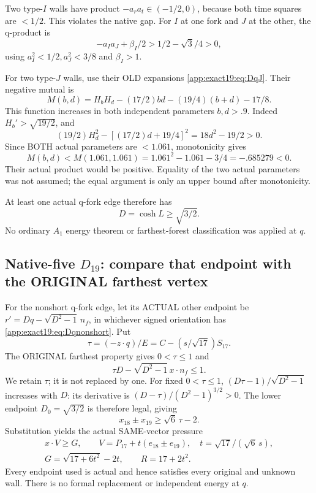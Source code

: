 \documentclass[11pt]{article}
\theoremstyle{definition}
\theoremstyle{remark}
\begin{document}
Two type-\(I\) walls have product
\(-a_ra_t\in(-1/2,0)\), because
both time squares are \(<1/2\).
This violates the native gap.
For \(I\) at one fork and \(J\)
at the other, the q-product is
\[
             -a_Ia_J+\beta_I/2
                     >1/2-\sqrt3/4>0 ,
\]
using \(a_I^2<1/2,a_J^2<3/8\)
and \(\beta_I>1\).

For two type-\(J\) walls, use
their OLD expansions
\eqref{app:exact19:eq:DqJ}.
Their negative mutual is
\[
 M(b,d)=H_bH_d-(17/2)bd-(19/4)(b+d)-17/8 .
\]
This function increases in both
independent parameters \(b,d>.9\).
Indeed \(H_b'>\sqrt{19/2}\), and
\[
                 (19/2)H_d^2-[(17/2)d+19/4]^2
                                      =18d^2-19/2>0 .
\]
Since BOTH actual parameters are
\(<1.061\), monotonicity gives
\[
 M(b,d)<M(1.061,1.061)
           =1.061^2-1.061-3/4=-.685279<0 .
\]
Their actual product would be
positive.
Equality of the two actual
parameters was not assumed;
the equal argument is only an
upper bound after monotonicity.

At least one actual q-fork edge
therefore has
\[
                              D=\cosh L\ge\sqrt{3/2}.
\tag{D19qnonshort}\label{app:exact19:eq:Dqnonshort}
\]
No ordinary \(A_1\) energy theorem
or farthest-forest classification
was applied at \(q\).

\subsection{Native-five \(D_{19}\): compare that endpoint with the ORIGINAL farthest vertex}
\label{app:exact19:Dfiveqfinish}

For the nonshort q-fork edge,
let its ACTUAL other endpoint be
\(r'=Dq-\sqrt{D^2-1}\,n_f\),
in whichever signed orientation
has
\eqref{app:exact19:eq:Dqnonshort}.
Put
\[
                \tau=(-z\cdot q)/E
                        =C-(s/\sqrt{17})S_{17}.
\]
The ORIGINAL farthest property
gives \(0<\tau\le1\) and
\[
                       \tau D-\sqrt{D^2-1}\,x\cdot n_f\le1 .
\]
We retain \(\tau\); it is not
replaced by one.
For fixed \(0<\tau\le1\),
\((D\tau-1)/\sqrt{D^2-1}\)
increases with \(D\):
its derivative is
\((D-\tau)/(D^2-1)^{3/2}>0\).
The lower endpoint
\(D_0=\sqrt{3/2}\) is therefore
legal, giving
\[
                               x_{18}\pm x_{19}\ge\sqrt6\,\tau-2 .
\]
Substitution yields the actual
SAME-vector pressure
\[
\begin{gathered}
 x\cdot V\ge G,\qquad
 V=P_{17}+t(e_{18}\pm e_{19}),\quad
 t=\sqrt{17}/(\sqrt6\,s),\\
                   G=\sqrt{17+6t^2}-2t,\qquad R=17+2t^2 .
\end{gathered}
\]
Every endpoint used is actual
and hence satisfies every
original and unknown wall.
There is no formal replacement
or independent energy at \(q\).
\end{document}
